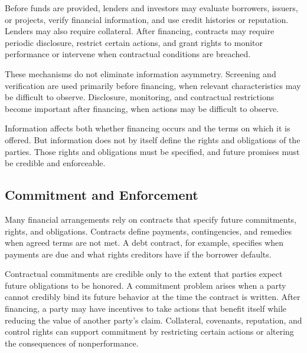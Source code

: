 \begin{tcolorbox}[
  enhanced,
  breakable,
  colback=white,
  colframe=FinanceBlue,
  boxrule=0.7pt,
  sharp corners,
  borderline west={2.2pt}{0pt}{FinanceBlue},
  title=\textbf{Finance Perspective: Why Financial Contracts Do More Than Transfer Funds},
  coltitle=white,
  colbacktitle=FinanceBlue,
  fonttitle=\bfseries,
  before skip=1.2em,
  after skip=1.2em
]
Before funds are provided, lenders and investors may evaluate borrowers, issuers, or projects, verify financial information, and use credit histories or reputation. Lenders may also require collateral. After financing, contracts may require periodic disclosure, restrict certain actions, and grant rights to monitor performance or intervene when contractual conditions are breached.

These mechanisms do not eliminate information asymmetry. Screening and verification are used primarily before financing, when relevant characteristics may be difficult to observe. Disclosure, monitoring, and contractual restrictions become important after financing, when actions may be difficult to observe.
\end{tcolorbox}

Information affects both whether financing occurs and the terms on which it is offered. But information does not by itself define the rights and obligations of the parties. Those rights and obligations must be specified, and future promises must be credible and enforceable.


\subsection{Commitment and Enforcement}

Many financial arrangements rely on contracts that specify future commitments, rights, and obligations. Contracts define payments, contingencies, and remedies when agreed terms are not met. A debt contract, for example, specifies when payments are due and what rights creditors have if the borrower defaults.

Contractual commitments are credible only to the extent that parties expect future obligations to be honored. A commitment problem arises when a party cannot credibly bind its future behavior at the time the contract is written. After financing, a party may have incentives to take actions that benefit itself while reducing the value of another party's claim. Collateral, covenants, reputation, and control rights can support commitment by restricting certain actions or altering the consequences of nonperformance.

